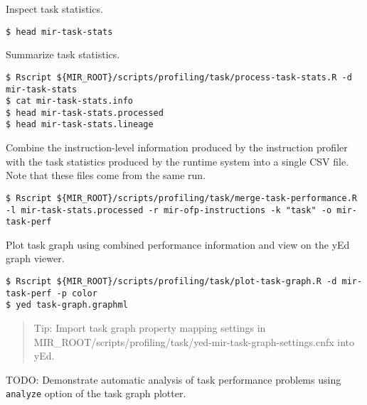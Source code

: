 \documentclass[11pt,a4paper]{article}
\begin{document}
Inspect task statistics.

\begin{lstlisting}[style=MyInputStyle]
$ head mir-task-stats
\end{lstlisting}

Summarize task statistics.

\begin{lstlisting}[style=MyInputStyle]
$ Rscript ${MIR_ROOT}/scripts/profiling/task/process-task-stats.R -d mir-task-stats
$ cat mir-task-stats.info
$ head mir-task-stats.processed
$ head mir-task-stats.lineage
\end{lstlisting}

Combine the instruction-level information produced by the instruction profiler with the task statistics produced by the runtime system into a single CSV file. Note that these files come from the same run.

\begin{lstlisting}[style=MyInputStyle]
$ Rscript ${MIR_ROOT}/scripts/profiling/task/merge-task-performance.R -l mir-task-stats.processed -r mir-ofp-instructions -k "task" -o mir-task-perf
\end{lstlisting}

Plot task graph using combined performance information and view on the yEd graph viewer.

\begin{lstlisting}[style=MyInputStyle]
$ Rscript ${MIR_ROOT}/scripts/profiling/task/plot-task-graph.R -d mir-task-perf -p color
$ yed task-graph.graphml
\end{lstlisting}

\begin{framed}
\begin{quote}
Tip: Import task graph property mapping settings in MIR\_ROOT/scripts/profiling/task/yed-mir-task-graph-settings.cnfx into yEd.
\end{quote}
\end{framed}

TODO: Demonstrate automatic analysis of task performance problems using \texttt{analyze} option of the task graph plotter.
\end{document}
